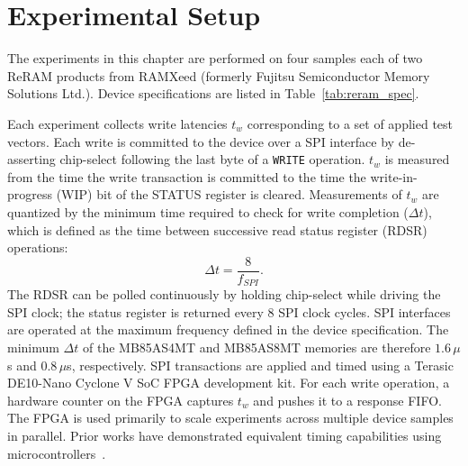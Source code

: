 \section{Experimental Setup}
\label{sec:brewrc-setup}



The experiments in this chapter are performed on four samples each of
two ReRAM products from RAMXeed (formerly Fujitsu Semiconductor Memory
Solutions Ltd.). Device specifications are listed in
Table~\ref{tab:reram_spec}.



Each experiment collects write latencies $t_w$ corresponding to a set of
applied test vectors. Each write is committed to the device over a SPI
interface by de-asserting chip-select following the last byte of a
\texttt{WRITE} operation. $t_w$ is measured from the time the write
transaction is committed to the time the write-in-progress (WIP) bit of
the STATUS register is cleared. Measurements of $t_w$ are quantized by
the minimum time required to check for write completion ($\Delta t$),
which is defined as the time between successive read status register
(RDSR) operations:
\begin{equation}
	\Delta t = \frac{8}{f_{SPI}}.
\end{equation}
The RDSR can be polled continuously by holding chip-select while driving the SPI clock; the status register is returned every 8 SPI clock cycles. SPI interfaces are operated at the maximum frequency defined in the device specification. The minimum $\Delta t$ of the MB85AS4MT and MB85AS8MT memories are therefore $1.6\,\mu$s and $0.8\,\mu$s, respectively.
SPI transactions are applied and timed using a Terasic DE10-Nano Cyclone V SoC FPGA development kit. For each write operation, a hardware counter on the FPGA captures $t_w$ and pushes it to a response FIFO. The FPGA is used primarily to scale experiments across multiple device samples in parallel. Prior works have demonstrated equivalent timing capabilities using microcontrollers~\cite{tolga2024trng, ferdaus2024hiding}.
